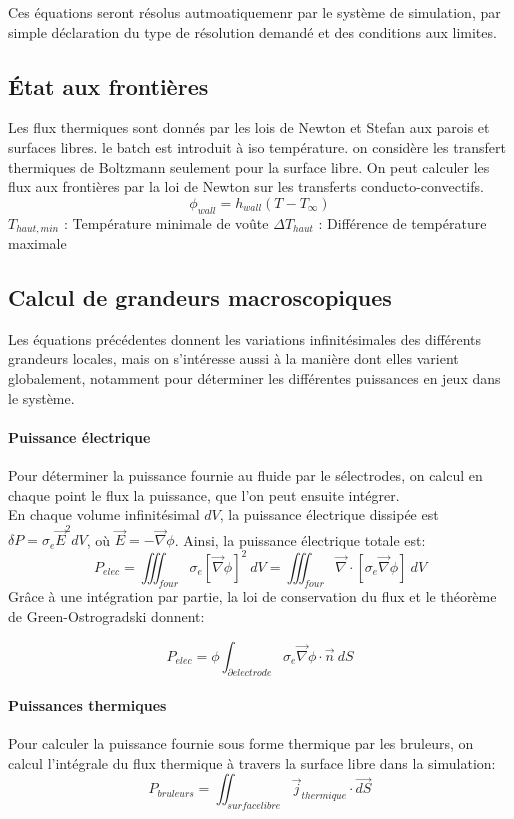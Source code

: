 \documentclass[12pt, a4paper, french, BCOR = 0pt, DIV = 10]{scrartcl}
\begin{document}
    Ces équations seront résolus autmoatiquemenr par le système de simulation, par simple déclaration du type de résolution demandé et des conditions aux limites.

        
    \subsection{État aux frontières}
    
    Les flux thermiques sont donnés par les lois de Newton et Stefan aux parois et surfaces libres. le batch est introduit à iso température. on considère les transfert thermiques de Boltzmann seulement pour la surface libre.
    On peut calculer les flux aux frontières par la loi de Newton sur les transferts conducto-convectifs.
        $$
        \phi_{wall} = h_{wall} (T - T_{\infty})
        $$
    $T_{haut, min}$ : Température minimale de voûte
    \break
    $\Delta T_{haut}$ : Différence de température maximale


    
    \subsection{Calcul de grandeurs macroscopiques}
    Les équations précédentes donnent les variations infinitésimales des différents grandeurs locales, mais on s'intéresse aussi à la manière dont elles varient globalement, notamment pour déterminer les différentes puissances en jeux dans le système.
    \paragraph{Puissance électrique}Pour déterminer la puissance fournie au fluide par le sélectrodes, on calcul en chaque point le flux la puissance, que l'on peut ensuite intégrer.\\
    En chaque volume infinitésimal $dV$, la puissance électrique dissipée est $\delta P = \sigma_{e} \vec{E}^{2} dV$, où $\vec{E} = -\vec{\nabla} \phi$. Ainsi, la puissance électrique totale est:
    $$
    P_{elec}=\iiint_{four} \sigma_{e}\left[\vec \nabla\phi\right]^2~dV  = \iiint_{four} \vec \nabla \cdot \left[\sigma_{e}\vec \nabla\phi\right]~dV
    $$
    Grâce à une intégration par partie, la loi de conservation du flux et le théorème de Green-Ostrogradski donnent:

    $$P_{elec}=\phi \int_{\partial electrode} \sigma_{e} \vec \nabla\phi \cdot \vec{n}~dS
    $$

    \paragraph{Puissances thermiques}
    Pour calculer la puissance fournie sous forme thermique par les bruleurs, on calcul l'intégrale du flux thermique à travers la surface libre dans la simulation:
    $$
        P_{bruleurs} = \iint_{surface libre} \vec{j}_{thermique} \cdot \vec{dS}
    $$
\end{document}
